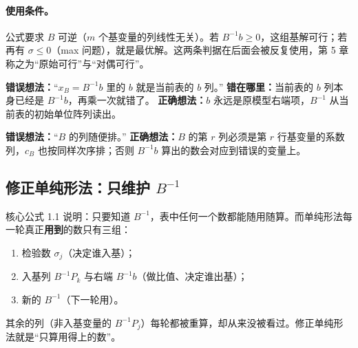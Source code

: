 \paragraph{使用条件。}公式要求 $B$ 可逆（$m$ 个基变量的列线性无关）。若 $B^{-1}b\ge0$，这组基解可行；若再有 $\sigma\le0$（max 问题），就是最优解。这两条判据在后面会被反复使用，第 5 章称之为“原始可行”与“对偶可行”。

\begin{warningbox}
\textbf{错误想法：}“$x_B=B^{-1}b$ 里的 $b$ 就是当前表的 $b$ 列。”\quad
\textbf{错在哪里：}当前表的 $b$ 列本身已经是 $B^{-1}b$，再乘一次就错了。\quad
\textbf{正确想法：}$b$ 永远是原模型右端项，$B^{-1}$ 从当前表的初始单位阵列读出。

\textbf{错误想法：}“$B$ 的列随便排。”\quad
\textbf{正确想法：}$B$ 的第 $r$ 列必须是第 $r$ 行基变量的系数列，$c_B$ 也按同样次序排；否则 $B^{-1}b$ 算出的数会对应到错误的变量上。
\end{warningbox}

\begin{figure}[!htbp]\centering
{}
\end{figure}

\subsection{修正单纯形法：只维护 $B^{-1}$}

核心公式 1.1 说明：只要知道 $B^{-1}$，表中任何一个数都能随用随算。而单纯形法每一轮真正\textbf{用到}的数只有三组：
\begin{enumerate}
  \item 检验数 $\sigma_j$（决定谁入基）；
  \item 入基列 $B^{-1}P_k$ 与右端 $B^{-1}b$（做比值、决定谁出基）；
  \item 新的 $B^{-1}$（下一轮用）。
\end{enumerate}
其余的列（非入基变量的 $B^{-1}P_j$）每轮都被重算，却从来没被看过。修正单纯形法就是“只算用得上的数”。

